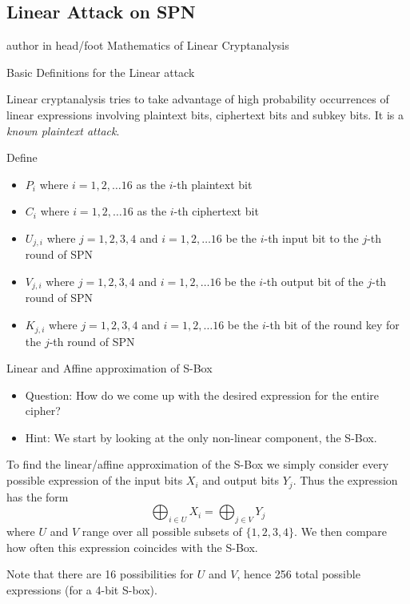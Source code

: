 \documentclass[9pt]{beamer}
\begin{document}
\subsection{Linear Attack on SPN}
\begin{frame}
\begin{beamercolorbox}[ht=2.5ex,dp=1.125ex,center,rounded=true,shadow=true]{author in head/foot}
Mathematics of Linear Cryptanalysis
\end{beamercolorbox}
\end{frame}

\begin{frame}
Basic Definitions for the Linear attack

\vspace{5 mm}
\pause Linear cryptanalysis tries to take advantage of high probability occurrences of linear expressions involving plaintext bits, ciphertext bits and subkey bits. It is a {\it known plaintext attack}.

\vspace{5 mm}
\pause Define 
\begin{itemize}[<+->]
\item{$P_i$ where $i = 1, 2, \dots 16$ as the $i$-th plaintext bit}
\item{$C_i$ where $i = 1, 2, \dots 16$ as the $i$-th ciphertext bit}
\item{$U_{j,i}$ where $j = 1, 2, 3, 4$ and $i = 1, 2, \dots 16$ be the $i$-th input bit to the $j$-th round of SPN}
\item{$V_{j,i}$ where $j = 1, 2, 3, 4$ and $i = 1, 2, \dots 16$ be the $i$-th output bit of the $j$-th round of SPN}
\item{$K_{j,i}$ where $j = 1, 2, 3, 4$ and $i = 1, 2, \dots 16$ be the $i$-th bit of the round key for the $j$-th round of SPN}
\end{itemize}
\end{frame}

\begin{frame}
Linear and Affine approximation of S-Box

\vspace{5mm}
\begin{itemize}[<+->]
\item Question: How do we come up with the desired expression for the entire cipher? 
\item Hint: We start by looking at the only non-linear component, the S-Box.
\end{itemize}

\vspace{5mm}
\pause To find the linear/affine approximation of the S-Box we simply consider every possible expression of the input bits $X_i$ and output bits $Y_j$. \pause Thus the expression has the form
\[ \bigoplus_{i \in U} X_i = \bigoplus_{j \in V} Y_j \]
where $U$ and $V$ range over all possible subsets of $\{1, 2, 3 ,4\}$. \pause We then compare how often this expression coincides with the S-Box.

\vspace{5mm}
\pause Note that there are 16 possibilities for $U$ and $V$, hence 256 total possible expressions (for a 4-bit S-box).
\end{frame}
\end{document}
